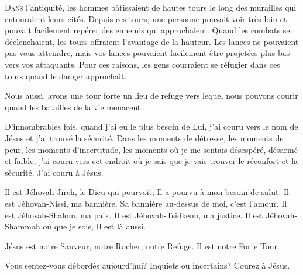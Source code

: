 \lettrine{D}{ans} l'antiquité, les hommes bâtissaient de hautes tours
 le long des murailles qui entouraient leurs cités.
 Depuis ces tours, une personne pouvait voir très loin et pouvait facilement
 repérer des ennemis qui approchaient.
 Quand les combats se déclenchaient, les tours offraient
 l'avantage de la hauteur. Les lances ne pouvaient pas vous atteindre,
 mais vos lances pouvaient facilement être projetées plus bas
 vers vos attaquants.
 Pour ces raisons, les gens courraient se réfugier dans ces tours
 quand le danger approchait. 

Nous aussi, avons une tour forte \ocadr un lieu de refuge vers lequel
 nous pouvons courir quand les batailles de la vie menacent. 


D'innombrables fois, quand j'ai eu le plus besoin de Lui,
 j'ai couru vers le nom de Jésus et j'ai trouvé la sécurité.
 Dans les moments de détresse, les moments de peur,
 les moments d'incertitude, les moments où je me sentais désespéré,
 désarmé et faible, j'ai couru vers cet endroit où je sais
 que je vais trouver le réconfort et la sécurité. J'ai couru à Jésus. 

Il est Jéhovah-Jireh, le Dieu qui pourvoit; Il 
 a pourvu à mon besoin de salut. Il est Jéhovah-Nissi, ma bannière.
 Sa bannière au-dessus de moi, c'est l'amour. Il est Jéhovah-Shalom, 
 ma paix. Il est Jéhovah-Tsidkenu, ma justice. Il est Jéhovah-Shammah 
 \ocadr où que je sois, Il est là aussi. 

Jésus est notre Sauveur, notre Rocher, notre Refuge. Il est notre Forte Tour. 

Vous sentez-vous débordés aujourd'hui? Inquiets 
 ou incertains? Courez à Jésus. 

\dvrule







